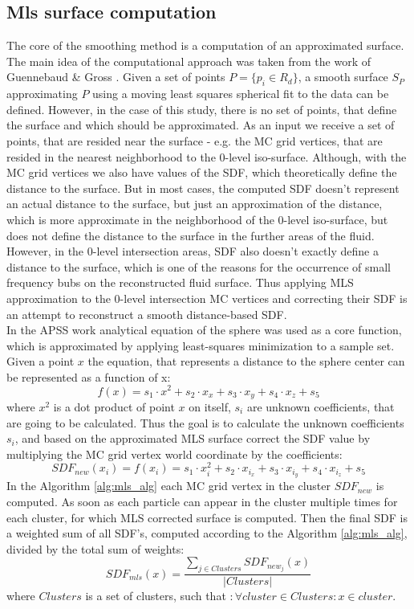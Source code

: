 \subsection{Mls surface computation}

The core of the smoothing method is a computation of an approximated surface. 
The main idea of the computational approach was taken from the work of Guennebaud \& Gross \cite{Apss}. 
Given a set of points $P = \{p_i \in R_d \}$, a smooth surface $S_P$ approximating $P$ using a moving least squares spherical fit to the data can be defined. However, in the case of this study, there is no set of points, that define the surface and which should be approximated. As an input we receive a set of points, that are resided near the surface - e.g. the MC grid vertices, that are resided in the nearest neighborhood to the 0-level iso-surface. 
Although, with the MC grid vertices we also have values of the SDF, which theoretically define the distance to the surface. But in most cases, the computed SDF doesn't represent an actual distance to the surface, but just an approximation of the distance, which is more approximate in the neighborhood of the 0-level iso-surface, but does not define the distance to the surface in the further areas of the fluid. 
However, in the 0-level intersection areas, SDF also doesn't exactly define a distance to the surface, which is one of the reasons for the occurrence of small frequency bubs on the reconstructed fluid surface. Thus applying MLS approximation to the 0-level intersection MC vertices and correcting their SDF is an attempt to reconstruct a smooth distance-based SDF.\\
In the APSS work analytical equation of the sphere was used as a core function, which is approximated by applying least-squares minimization to a sample set. Given a point $x$ the equation, that represents a distance to the sphere center can be represented as a function of x:
\begin{equation}
f(x) = s_1\cdot x^2 + s_2 \cdot x_x + s_3 \cdot x_y + s_4 \cdot x_z + s_5
\end{equation}
where $x^2$ is a dot product of point $x$ on itself, $s_i$ are unknown coefficients, that are going to be calculated. Thus the goal is to calculate the unknown coefficients $s_i$, and based on the approximated MLS surface correct the SDF value by multiplying the MC grid vertex world coordinate by the coefficients:
\begin{equation}
SDF_{new}(x_i) = f(x_i) = s_1\cdot x_i^2 + s_2 \cdot x_{i_x} + s_3 \cdot x_{i_y} + s_4 \cdot x_{i_z} + s_5
\end{equation}
In the Algorithm \ref{alg:mls_alg} each MC grid vertex in the cluster $SDF_{new}$ is computed. As soon as each particle can appear in the cluster multiple times for each cluster, for which MLS corrected surface is computed. Then the final SDF is a weighted sum of all SDF's, computed according to the Algorithm \ref{alg:mls_alg}, divided by the total sum of weights:
\begin{equation}
	SDF_{mls}(x) = \dfrac{\sum_{j \in Clusters}{SDF_{new_j}(x)}}{|Clusters|}
\end{equation}
where $Clusters$ is a set of clusters, such that $: \forall cluster \in Clusters: x \in cluster$. 

